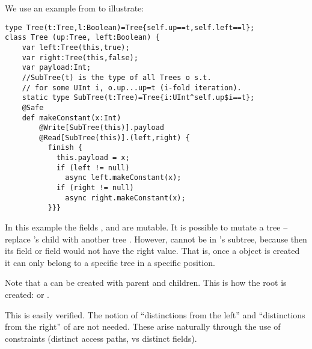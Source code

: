 


We use an example from \cite{DPJ} to illustrate:
  \begin{lstlisting}
type Tree(t:Tree,l:Boolean)=Tree{self.up==t,self.left==l};
class Tree (up:Tree, left:Boolean) {
    var left:Tree(this,true);
    var right:Tree(this,false);
    var payload:Int;
    //SubTree(t) is the type of all Trees o s.t.
    // for some UInt i, o.up...up=t (i-fold iteration).
    static type SubTree(t:Tree)=Tree{i:UInt^self.up$i==t};
    @Safe
    def makeConstant(x:Int)
        @Write[SubTree(this)].payload
        @Read[SubTree(this)].(left,right) {
          finish {
            this.payload = x;
            if (left != null)
              async left.makeConstant(x);
            if (right != null)
              async right.makeConstant(x);
          }}}
  \end{lstlisting}
In this example the fields , and 
are mutable. It is possible to mutate a tree  -- replace
's  child with another tree . However,  cannot be in
's  subtree, because then its  field or
 field would not have the right value. That is, once a
 object is created it can only belong to a specific tree in
a specific position.

Note that a  can be created with  parent and
children. This is how the root is created:
 or .

This is easily verified.
The notion of ``distinctions from the left'' and ``distinctions from
the right'' of \cite{DPJ} are not needed. These arise naturally
through the use of constraints (distinct access paths, vs distinct fields).

